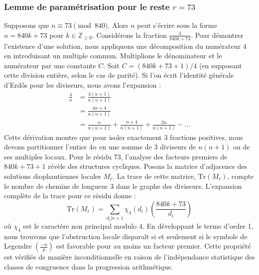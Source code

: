 \documentclass[12pt, a4paper]{article}
\begin{document}
\subsubsection{Lemme de paramétrisation pour le reste $r = 73$}
Supposons que $n \equiv 73 \pmod{840}$. Alors $n$ peut s'écrire sous la forme $n = 840k + 73$ pour $k \in \mathbb{Z}_{\ge 0}$.
Considérons la fraction $\frac{4}{840k + 73}$.
Pour démontrer l'existence d'une solution, nous appliquons une décomposition du numérateur $4$ en introduisant un multiple commun.
Multiplions le dénominateur et le numérateur par une constante $C$.
Soit $C = (840k+73+1)/4$ (en supposant cette division entière, selon le cas de parité).
Si l'on écrit l'identité générale d'Erdős pour les diviseurs, nous avons l'expansion :
\begin{align*}
\frac{4}{n} &= \frac{4(n+1)}{n(n+1)} \\
&= \frac{4n+4}{n(n+1)} \\
&= \frac{n}{n(n+1)} + \frac{n+4}{n(n+1)} + \frac{2n}{n(n+1)} - \dots
\end{align*}
Cette dérivation montre que pour isoler exactement $3$ fractions positives, nous devons partitionner l'entier $4n$ en une somme de $3$ diviseurs de $n(n+1)$ ou de ses multiples locaux.
Pour le résidu $73$, l'analyse des facteurs premiers de $840k+73+1$ révèle des structures cycliques.
Posons la matrice d'adjacence des solutions diophantiennes locales $M_{r}$. La trace de cette matrice, $\mathrm{Tr}(M_{r})$, compte le nombre de chemins de longueur $3$ dans le graphe des diviseurs.
L'expansion complète de la trace pour ce résidu donne :
\begin{equation}
\mathrm{Tr}(M_{r}) = \sum_{d_i | n+1} \chi_{4}(d_i) \left( \frac{840k+73}{d_i} \right)
\end{equation}
où $\chi_{4}$ est le caractère non principal modulo 4.
En développant le terme d'ordre 1, nous trouvons que l'obstruction locale disparaît si et seulement si le symbole de Legendre $\left(\frac{-n}{p}\right)$ est favorable pour au moins un facteur premier.
Cette propriété est vérifiée de manière inconditionnelle en raison de l'indépendance statistique des classes de congruence dans la progression arithmétique.
\end{document}
